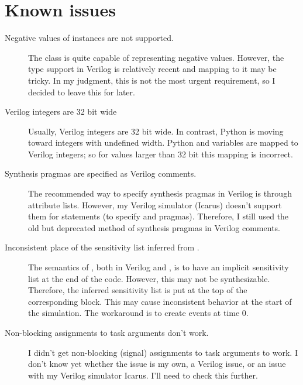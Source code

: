 \section{Known issues\label{conv-issues}}
\begin{description}

\item[Negative values of  instances are not supported.]
The  class is quite capable of representing negative
values. However, the  type support in Verilog is
relatively recent and mapping to it may be tricky. In my judgment,
this is not the most urgent requirement, so
I decided to leave this for later.

\item[Verilog integers are 32 bit wide]
Usually, Verilog integers are 32 bit wide. In contrast, Python is
moving toward integers with undefined width. Python  
and  variables are mapped to Verilog integers; so for values
larger than 32 bit this mapping is incorrect.

\item[Synthesis pragmas are specified as Verilog comments.] The recommended
way to specify synthesis pragmas in Verilog is through attribute
lists. However, my Verilog simulator (Icarus) doesn't support them
for  statements (to specify  and
 pragmas). Therefore, I still used the old
but deprecated method of synthesis pragmas in Verilog comments.

\item[Inconsistent place of the sensitivity list inferred from .]
The semantics of , both in Verilog and \myhdl{}, is to
have an implicit sensitivity list at the end of the code. However, this
may not be synthesizable. Therefore, the inferred sensitivity list is
put at the top of the corresponding  block.
This may cause inconsistent behavior at the start of the
simulation. The workaround is to create events at time 0.

\item[Non-blocking assignments to task arguments don't work.] 
I didn't get non-blocking (signal) assignments to task arguments to
work.  I don't know yet whether the issue is my own, a Verilog issue,
or an issue with my Verilog simulator Icarus. I'll need to check this
further.

\end{description}
